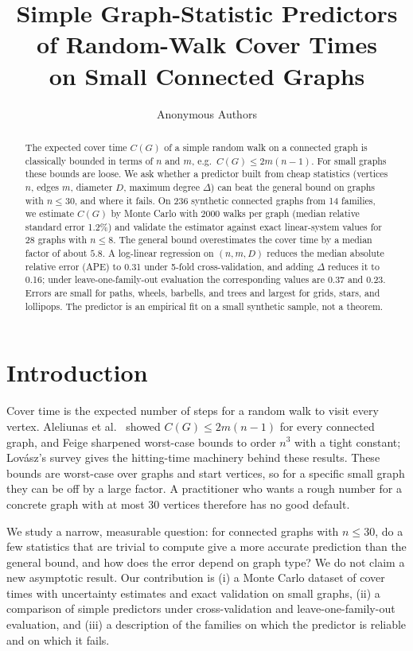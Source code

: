 \documentclass{article} %
\title{Simple Graph-Statistic Predictors of Random-Walk Cover Times\\on Small Connected Graphs}
\author{Anonymous Authors}
\newcommand{\cover}{C}
\begin{document}
\maketitle

\begin{abstract}
The expected cover time $\cover(G)$ of a simple random walk on a connected graph is classically bounded in terms of $n$ and $m$, e.g.\ $\cover(G)\le 2m(n-1)$. For small graphs these bounds are loose. We ask whether a predictor built from cheap statistics (vertices $n$, edges $m$, diameter $D$, maximum degree $\Delta$) can beat the general bound on graphs with $n\le 30$, and where it fails. On 236 synthetic connected graphs from 14 families, we estimate $\cover(G)$ by Monte Carlo with 2000 walks per graph (median relative standard error 1.2\%) and validate the estimator against exact linear-system values for 28 graphs with $n\le 8$. The general bound overestimates the cover time by a median factor of about $5.8$. A log-linear regression on $(n,m,D)$ reduces the median absolute relative error (APE) to 0.31 under 5-fold cross-validation, and adding $\Delta$ reduces it to 0.16; under leave-one-family-out evaluation the corresponding values are 0.37 and 0.23. Errors are small for paths, wheels, barbells, and trees and largest for grids, stars, and lollipops. The predictor is an empirical fit on a small synthetic sample, not a theorem.
\end{abstract}

\section{Introduction}
Cover time is the expected number of steps for a random walk to visit every vertex. Aleliunas et al.\ \citep{aleliunas1979} showed $\cover(G)\le 2m(n-1)$ for every connected graph, and Feige \citep{feige1995} sharpened worst-case bounds to order $n^3$ with a tight constant; Lovász's survey \citep{lovasz1993} gives the hitting-time machinery behind these results. These bounds are worst-case over graphs and start vertices, so for a specific small graph they can be off by a large factor. A practitioner who wants a rough number for a concrete graph with at most 30 vertices therefore has no good default.

We study a narrow, measurable question: for connected graphs with $n\le 30$, do a few statistics that are trivial to compute give a more accurate prediction than the general bound, and how does the error depend on graph type? We do not claim a new asymptotic result. Our contribution is (i) a Monte Carlo dataset of cover times with uncertainty estimates and exact validation on small graphs, (ii) a comparison of simple predictors under cross-validation and leave-one-family-out evaluation, and (iii) a description of the families on which the predictor is reliable and on which it fails.
\end{document}

